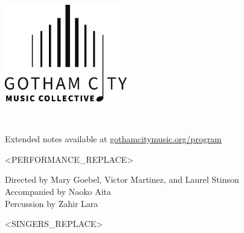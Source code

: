 \documentclass{article}[10pt]
\newcommand{\logo}{
        {\includegraphics[width=0.4\textwidth]{../../graphic_design_assets/bw_logo_full}}
}
\newcommand{\tunedspace}{\vspace{0.15in}}
\newcommand{\tunedspacesmall}{\vspace{0.07in}}
\begin{document}
    \begin{center}
        \logo
        \tunedspacesmall


        {\footnotesize\textbf{}}

        \tunedspace
        {
            \textbf{}\\

            \tunedspacesmall

            \footnotesize{
                Extended notes available at
                \href{https://gothamcitymusic.org/program}{gothamcitymusic.org/program}
            }
        }

        \tunedspacesmall

        \begin{minipage}{\textwidth}
            \begin{flushright}

                <PERFORMANCE_REPLACE>

            \end{flushright}
        \end{minipage}

        \tunedspace
        \vfill

        {
            \textbf{}

            \tunedspacesmall

            \begin{small}
                Directed by
                Mary Goebel,
                Victor Martinez,
                and
                Laurel Stinson\\
                Accompanied by Naoko Aita\\
                Percussion by Zahir Lara
            \end{small}

            \vspace{-0.1in}

            \begin{multicols*}{3}
                \begin{center}
                    \begin{small}
                        <SINGERS_REPLACE>
                    \end{small}
                \end{center}
            \end{multicols*}
        }



\end{center}
\end{document}
